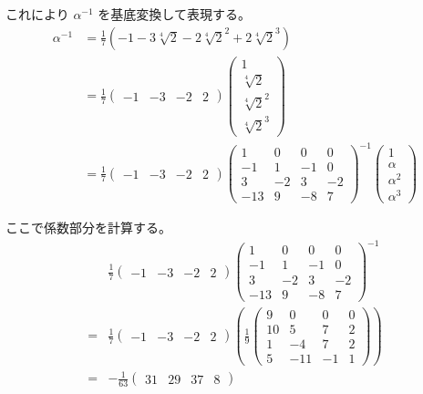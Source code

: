 \documentclass[12pt,b5paper]{ltjsarticle}
\begin{document}
\begin{enumerate}
      これにより
      $\alpha^{-1}$
      を基底変換して表現する。
      \begin{align}
       \alpha^{-1}
       &=
       \frac{1}{7}\left( -1 -3 \sqrt[4]{2} - 2 \sqrt[4]{2}^{2} + 2 \sqrt[4]{2}^{3}  \right)\\
       &=
       \frac{1}{7}
       \begin{pmatrix}
        -1 & -3 & -2 & 2
       \end{pmatrix}
       \begin{pmatrix}
        1 \\ \sqrt[4]{2} \\ \sqrt[4]{2}^{2} \\ \sqrt[4]{2}^{3}
       \end{pmatrix}\\
       &=
       \frac{1}{7}
       \begin{pmatrix}
        -1 & -3 & -2 & 2
       \end{pmatrix}
       \begin{pmatrix}
        1 & 0 & 0 & 0 \\
        -1 & 1 & -1 & 0 \\
        3 & -2 & 3 & -2 \\
        -13 & 9 & -8 & 7
       \end{pmatrix}
       ^{-1}
       \begin{pmatrix}
        1 \\ \alpha \\ \alpha^{2} \\ \alpha^{3}
       \end{pmatrix}
      \end{align}


      ここで係数部分を計算する。
      \begin{align}
       & \frac{1}{7}
       \begin{pmatrix}
        -1 & -3 & -2 & 2
       \end{pmatrix}
       \begin{pmatrix}
        1 & 0 & 0 & 0 \\
        -1 & 1 & -1 & 0 \\
        3 & -2 & 3 & -2 \\
        -13 & 9 & -8 & 7
       \end{pmatrix}
       ^{-1}\\
       =&
       \frac{1}{7}
       \begin{pmatrix}
        -1 & -3 & -2 & 2
       \end{pmatrix}
       \left(
       \frac{1}{9}
       \begin{pmatrix}
        9 & 0 & 0 & 0 \\
        10 & 5 & 7 & 2 \\
        1 & -4 & 7 & 2 \\
        5 & -11 & -1 & 1
       \end{pmatrix}
       \right)\\
       =&
       -\frac{1}{63}
       \begin{pmatrix}
        31 & 29 & 37 & 8
       \end{pmatrix}
      \end{align}


\end{enumerate}
\end{document}
